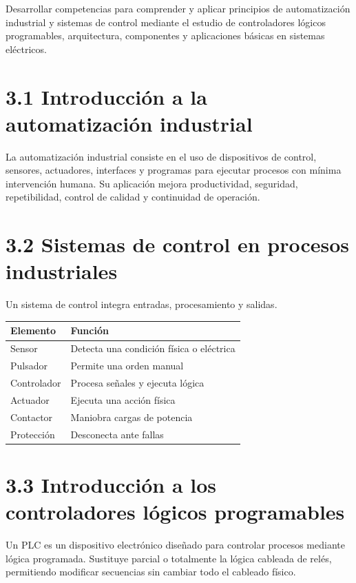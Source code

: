 \documentclass[
  spanish,
  letterpaper,
  DIV=11,
  numbers=noendperiod]{scrreprt}
\newcounter{none} %
\begin{document}
Desarrollar competencias para comprender y aplicar principios de
automatización industrial y sistemas de control mediante el estudio de
controladores lógicos programables, arquitectura, componentes y
aplicaciones básicas en sistemas eléctricos.

\section{3.1 Introducción a la automatización
industrial}\label{introducciuxf3n-a-la-automatizaciuxf3n-industrial}

La automatización industrial consiste en el uso de dispositivos de
control, sensores, actuadores, interfaces y programas para ejecutar
procesos con mínima intervención humana. Su aplicación mejora
productividad, seguridad, repetibilidad, control de calidad y
continuidad de operación.

\section{3.2 Sistemas de control en procesos
industriales}\label{sistemas-de-control-en-procesos-industriales}

Un sistema de control integra entradas, procesamiento y salidas.

{\def\LTcaptype{none} %
\begin{longtable}[]{@{}ll@{}}
\toprule\noalign{}
Elemento & Función \\
\midrule\noalign{}
\endhead
\bottomrule\noalign{}
\endlastfoot
Sensor & Detecta una condición física o eléctrica \\
Pulsador & Permite una orden manual \\
Controlador & Procesa señales y ejecuta lógica \\
Actuador & Ejecuta una acción física \\
Contactor & Maniobra cargas de potencia \\
Protección & Desconecta ante fallas \\
\end{longtable}
}

\section{3.3 Introducción a los controladores lógicos
programables}\label{introducciuxf3n-a-los-controladores-luxf3gicos-programables}

Un PLC es un dispositivo electrónico diseñado para controlar procesos
mediante lógica programada. Sustituye parcial o totalmente la lógica
cableada de relés, permitiendo modificar secuencias sin cambiar todo el
cableado físico.
\end{document}
